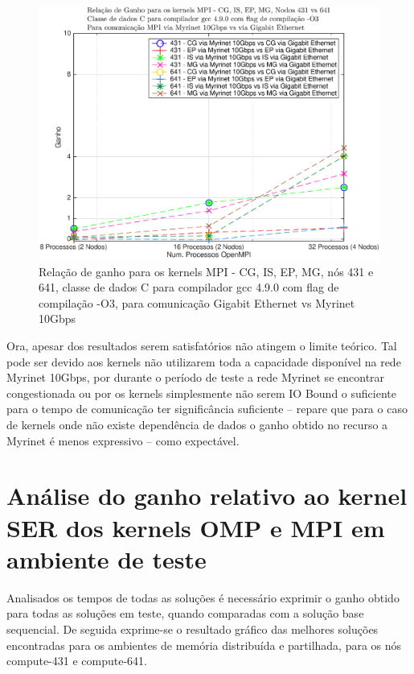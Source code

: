 \documentclass[conference,compsoc]{IEEEtran}
\begin{document}
\begin{figure}[H]
\centering
\includegraphics[width=1.1\columnwidth]{EPS/MPI/myri_vs_eth_431_vs_641.eps}
\caption{Relação de ganho para os kernels MPI - CG, IS, EP, MG, nós 431 e 641, classe de dados C para compilador gcc 4.9.0 com flag de compilação  -O3, para comunicação Gigabit Ethernet vs Myrinet 10Gbps}
\label{tempos_641}
\end{figure}

Ora, apesar dos resultados serem satisfatórios não atingem o limite teórico. Tal pode ser devido aos kernels não utilizarem toda a capacidade disponível na rede Myrinet 10Gbps, por durante o período de teste a rede Myrinet se encontrar congestionada ou por os kernels simplesmente não serem IO Bound o suficiente para o tempo de comunicação ter significância suficiente -- repare que para o caso de kernels onde não existe dependência de dados o ganho obtido no recurso a Myrinet é menos expressivo -- como expectável. 

\section{Análise do ganho relativo ao kernel SER dos kernels OMP e MPI em ambiente de  teste}

Analisados os tempos de todas as soluções é necessário exprimir o ganho obtido para todas as soluções em teste, quando comparadas com a solução base sequencial. De seguida exprime-se o resultado gráfico das melhores soluções encontradas para os ambientes de memória distribuída e partilhada, para os nós compute-431 e compute-641.
\end{document}
